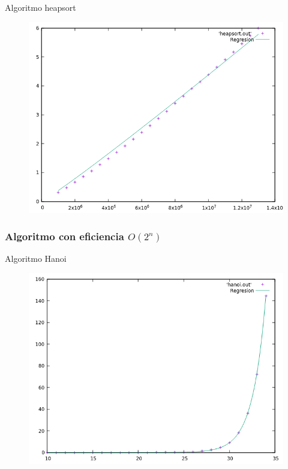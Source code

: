 \documentclass{beamer}
\begin{document}
\begin{frame}[fragile]{Algoritmo heapsort}
\begin{figure}[H]
\centering
\includegraphics[scale=0.5]{hibrida_heapsort.png}
\end{figure}
\end{frame}

\subsubsection{Algoritmo con eficiencia $O(2^n)$}

\begin{frame}[fragile]{Algoritmo Hanoi}
\begin{figure}[H]
\centering
\includegraphics[scale=0.5]{hibrida_hanoi.png}
\end{figure}
\end{frame}
\end{document}
